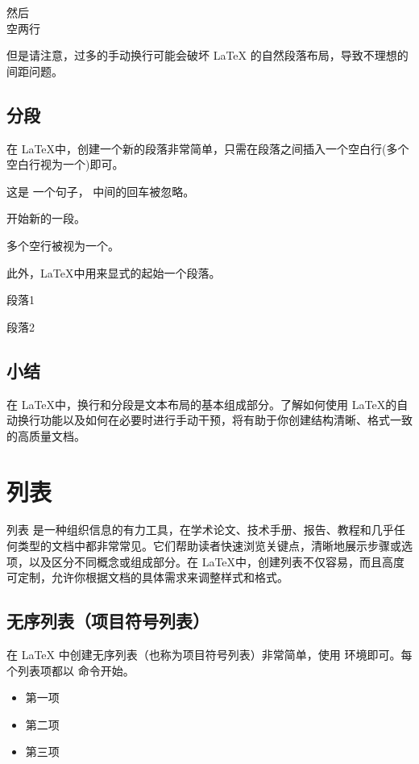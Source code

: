 {{{\begin{texlst}
	然后\\[2em]空两行
\end{texlst}

但是请注意，过多的手动换行可能会破坏 LaTeX 的自然段落布局，导致不理想的间距问题。
\subsection{分段}
在 \LaTeX 中，创建一个新的段落非常简单，只需在段落之间插入一个空白行(多个空白行视为一个)即可。
\begin{texlst}
	这是
	一个句子，
	中间的回车被忽略。

	开始新的一段。



	多个空行被视为一个。
\end{texlst}

此外，\LaTeX 中用\texinline{\par}来显式的起始一个段落。

\begin{texlst}
	段落1\par 段落2
\end{texlst}

\subsection{小结}
在 \LaTeX 中，换行和分段是文本布局的基本组成部分。了解如何使用 \LaTeX 的自动换行功能以及如何在必要时进行手动干预，将有助于你创建结构清晰、格式一致的高质量文档。

\section{列表}
列表
是一种组织信息的有力工具，在学术论文、技术手册、报告、教程和几乎任何类型的文档中都非常常见。它们帮助读者快速浏览关键点，清晰地展示步骤或选项，以及区分不同概念或组成部分。在
\LaTeX 中，创建列表不仅容易，而且高度可定制，允许你根据文档的具体需求来调整样式和格式。
\subsection{无序列表（项目符号列表）}
在 LaTeX 中创建无序列表（也称为项目符号列表）非常简单，使用  环境即可。每个列表项都以 \texinline{\item} 命令开始。
\begin{texlst}
	\begin{itemize}
		\item 第一项
		\item 第二项
		\item 第三项
	\end{itemize}
\end{texlst}

}}}
